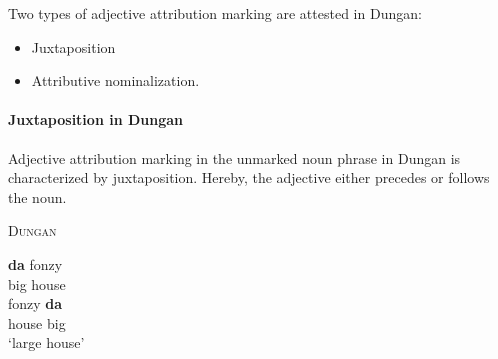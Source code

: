 \noindent Two types of adjective attribution marking are attested in Dungan:
\begin{itemize}
\item Juxtaposition
\item Attributive nominalization.
\end{itemize}

\paragraph{Juxtaposition in Dungan}
Adjective attribution marking in the unmarked noun phrase in Dungan is characterized by juxtaposition. Hereby, the adjective either precedes or follows the noun.
\begin{exe}
\ex \textsc{Dungan} \cite[480]{kalimov1968} \label{dungan juxtap}
\begin{xlist}
\ex 	
\gll	\textbf{da} fonzy\\
	big house\\
\ex
\gll	fonzy \textbf{da}\\
	house big\\
\glt	‘large house’
\end{xlist}
\end{exe}

